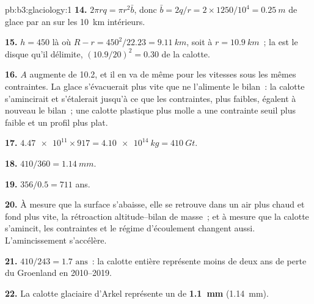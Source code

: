 \begin{solution}{pb:b3:glaciology:1}
\textbf{14.} $2\pi rq = \pi r^2\bar b$, donc $\bar b = 2q/r = 2\times1250/10^4
= \qty{0.25}{m}$ de glace par an sur les \qty{10}{km} intérieurs.

\textbf{15.} $h = 450$ là où $R - r = 450^2/22.23 = \qty{9.11}{km}$, soit à
$r = \qty{10.9}{km}$~; la  est le disque qu'il délimite, $(10.9/
20)^2 = 0.30$ de la calotte.

\textbf{16.} $A$ augmente de \num{10.2}, et il en va de même pour les vitesses sous les mêmes
contraintes. La glace s'évacuerait plus vite que ne l'alimente le bilan~: la
calotte s'amincirait et s'étalerait jusqu'à ce que les contraintes, plus faibles, égalent à nouveau le
bilan~; une calotte plastique plus molle a une contrainte seuil plus faible et un
profil plus plat.

\textbf{17.} $\num{4.47e11}\times917 = \qty{4.10e14}{kg} = \qty{410}{Gt}$.

\textbf{18.} $410/360 = \qty{1.14}{mm}$.

\textbf{19.} $356/0.5 = 711$ ans.

\textbf{20.} À mesure que la surface s'abaisse, elle se retrouve dans un air plus chaud et fond plus vite,
la rétroaction altitude--bilan de masse~; et à mesure que la calotte s'amincit, les contraintes et
le régime d'écoulement changent aussi. L'amincissement s'accélère.

\textbf{21.} $410/243 = \num{1.7}\text{ ans}$~: la calotte entière représente moins de deux
ans de perte du Groenland en 2010--2019.

\textbf{22.} La calotte glaciaire d'Arkel représente un  de
\textbf{\qty[text-series-to-math=true]{1.1}{mm}} (\qty{1.14}{mm}).
\end{solution}
